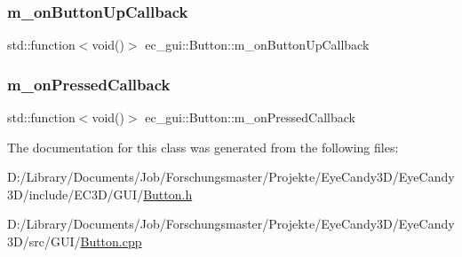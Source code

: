 \mbox{\label{classec__gui_1_1_button_a7a45721355492e635fe2d49578b22e23}} 
\subsubsection{\texorpdfstring{m\+\_\+on\+Button\+Up\+Callback}{m\_onButtonUpCallback}}
{\footnotesize\ttfamily std\+::function$<$void()$>$ ec\+\_\+gui\+::\+Button\+::m\+\_\+on\+Button\+Up\+Callback\hspace{0.3cm}{\ttfamily [protected]}}

\mbox{\label{classec__gui_1_1_button_aa4c9556354fa7cdd1f0365bccd1d2e28}} 
\subsubsection{\texorpdfstring{m\+\_\+on\+Pressed\+Callback}{m\_onPressedCallback}}
{\footnotesize\ttfamily std\+::function$<$void()$>$ ec\+\_\+gui\+::\+Button\+::m\+\_\+on\+Pressed\+Callback\hspace{0.3cm}{\ttfamily [protected]}}



The documentation for this class was generated from the following files\+:\begin{DoxyCompactItemize}
\item 
D\+:/\+Library/\+Documents/\+Job/\+Forschungsmaster/\+Projekte/\+Eye\+Candy3\+D/\+Eye\+Candy3\+D/include/\+E\+C3\+D/\+G\+U\+I/\mbox{\hyperlink{_button_8h}{Button.\+h}}\item 
D\+:/\+Library/\+Documents/\+Job/\+Forschungsmaster/\+Projekte/\+Eye\+Candy3\+D/\+Eye\+Candy3\+D/src/\+G\+U\+I/\mbox{\hyperlink{_button_8cpp}{Button.\+cpp}}\end{DoxyCompactItemize}

